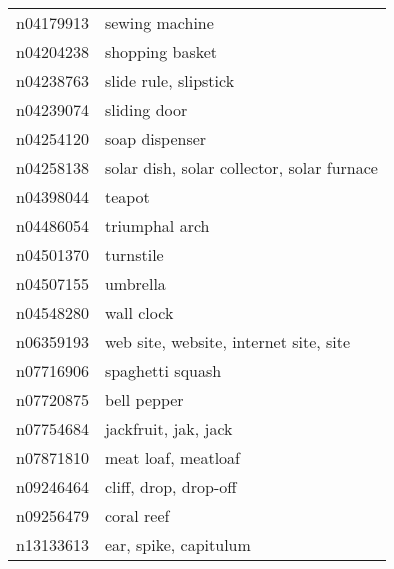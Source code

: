 \begin{appendices}
\begin{scriptsize}
\begin{longtabu}{X|X[4]}
    		n04179913 &                                                                                                             sewing machine \tabularnewline
    		n04204238 &                                                                                                            shopping basket \tabularnewline
    		n04238763 &                                                                                                      slide rule, slipstick \tabularnewline
    		n04239074 &                                                                                                               sliding door \tabularnewline
    		n04254120 &                                                                                                             soap dispenser \tabularnewline
    		n04258138 &                                                                                 solar dish, solar collector, solar furnace \tabularnewline
    		n04398044 &                                                                                                                     teapot \tabularnewline
    		n04486054 &                                                                                                             triumphal arch \tabularnewline
    		n04501370 &                                                                                                                  turnstile \tabularnewline
    		n04507155 &                                                                                                                   umbrella \tabularnewline
    		n04548280 &                                                                                                                 wall clock \tabularnewline
    		n06359193 &                                                                                     web site, website, internet site, site \tabularnewline
    		n07716906 &                                                                                                           spaghetti squash \tabularnewline
    		n07720875 &                                                                                                                bell pepper \tabularnewline
    		n07754684 &                                                                                                       jackfruit, jak, jack \tabularnewline
    		n07871810 &                                                                                                        meat loaf, meatloaf \tabularnewline
    		n09246464 &                                                                                                      cliff, drop, drop-off \tabularnewline
    		n09256479 &                                                                                                                 coral reef \tabularnewline
    		n13133613 &                                                                                                      ear, spike, capitulum \tabularnewline
    		\bottomrule
    	\end{longtabu}
        \end{scriptsize}
    	
    \end{appendices}

    \endgroup
    
    
    